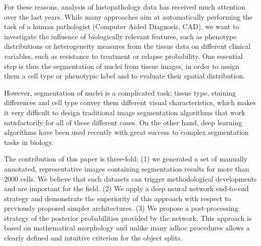 \documentclass{article}
\begin{document}
For these reasons, analysis of histopathology data has received much
attention over the last years. While many approaches aim at
automatically performing the task of a human pathologist (Computer
Aided Diagnosis, CAD), we want to investigate the influence of
biologically relevant features, such as phenotype distributions or
heterogeneity measures from the tissue data on different clinical
variables, such as resistance to treatment or relapse probability.
One essential step is thus the segmentation of nuclei from tissue
images,  in order to assign them a cell type or phenotypic label and
to evaluate their spatial distribution.



However, segmentation of nuclei is a
complicated task: tissue type, staining differences and cell type
convey them different visual characteristics, which makes it very difficult to
design traditional image segmentation algorithms that work
satisfactorily for all of these different cases. On the other hand,
deep learning algorithms have been used recently with great success to
complex segmentation tasks in biology\cite{Ciresan2012,UNet}. 

The contribution of this paper is three-fold: (1) we generated a
set of manually annotated, representative images containing segmentation results for
more than 2000 cells. We believe that such datasets
can trigger methodological developments and are
important for the field. (2) We apply a deep neural network end-to-end strategy and
demonstrate the superiority of this approach with respect to
previously proposed simpler architectures. (3) We propose a
post-processing strategy of the posterior probabilities provided by
the network. This approach is based on mathematical
morphology and unlike many adhoc procedures allows a clearly defined
and intuitive criterion for the object splits.
\end{document}
